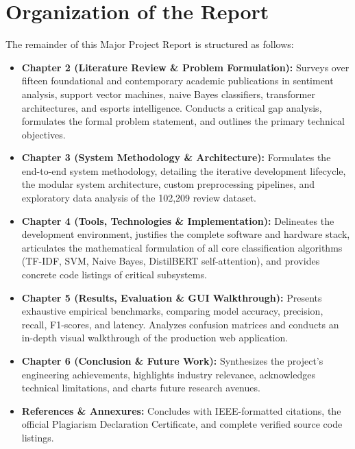 \section{Organization of the Report}
\label{sec:org_report}

The remainder of this Major Project Report is structured as follows:
\begin{itemize}
    \item \textbf{Chapter 2 (Literature Review \& Problem Formulation):} Surveys over fifteen foundational and contemporary academic publications in sentiment analysis, support vector machines, naive Bayes classifiers, transformer architectures, and esports intelligence. Conducts a critical gap analysis, formulates the formal problem statement, and outlines the primary technical objectives.
    \item \textbf{Chapter 3 (System Methodology \& Architecture):} Formulates the end-to-end system methodology, detailing the iterative development lifecycle, the modular system architecture, custom preprocessing pipelines, and exploratory data analysis of the 102,209 review dataset.
    \item \textbf{Chapter 4 (Tools, Technologies \& Implementation):} Delineates the development environment, justifies the complete software and hardware stack, articulates the mathematical formulation of all core classification algorithms (TF-IDF, SVM, Naive Bayes, DistilBERT self-attention), and provides concrete code listings of critical subsystems.
    \item \textbf{Chapter 5 (Results, Evaluation \& GUI Walkthrough):} Presents exhaustive empirical benchmarks, comparing model accuracy, precision, recall, F1-scores, and latency. Analyzes confusion matrices and conducts an in-depth visual walkthrough of the production web application.
    \item \textbf{Chapter 6 (Conclusion \& Future Work):} Synthesizes the project's engineering achievements, highlights industry relevance, acknowledges technical limitations, and charts future research avenues.
    \item \textbf{References \& Annexures:} Concludes with IEEE-formatted citations, the official Plagiarism Declaration Certificate, and complete verified source code listings.
\end{itemize}
